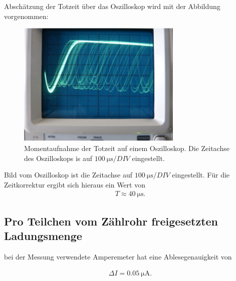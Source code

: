 \justifying Abschätzung der Totzeit über das Oszilloskop wird mit der Abbildung vorgenommen:
\begin{figure}[H]
    \centering
    \includegraphics[width=0.7\textwidth]{images/oszi.jpg}
    \caption{Momentaufnahme der Totzeit auf einem Oszilloskop\cite{matplotlib}.
    Die Zeitachse des Oszilloskops is auf $\SI{100}{\micro\second}/DIV $ eingestellt.
    }
    \label{fig:8}
\end{figure}
\justifying  Bild vom Oszilloskop ist die Zeitachse auf  $\SI{100}{\micro\second}/DIV $
eingestellt.
Für die Zeitkorrektur ergibt sich hieraus ein Wert von 
\begin{align}
    T \approx \SI{40}{\micro\second} \label{eq:10} .
\end{align}


\subsection{Pro Teilchen vom Zählrohr freigesetzten Ladungsmenge}

\justifying bei der Messung verwendete Amperemeter hat eine Ablesegenauigkeit von

\begin{align}
    \Delta I = \SI{0.05}{\micro\ampere} \label{eq:11}.
\end{align}

